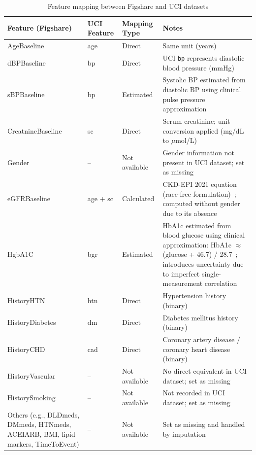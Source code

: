 \begin{table}[ht]
\centering
\caption{Feature mapping between Figshare and UCI datasets}
\label{tab:feature_mapping}
\begin{tabular}{|p{3.8cm}|p{3.2cm}|p{2.4cm}|p{5.8cm}|}
\hline
\textbf{Feature (Figshare)} & \textbf{UCI Feature} & \textbf{Mapping Type} & \textbf{Notes} \\ \hline
AgeBaseline & age & Direct & Same unit (years) \\ \hline
dBPBaseline & bp & Direct & UCI \texttt{bp} represents diastolic blood pressure (mmHg) \\ \hline
sBPBaseline & bp & Estimated & Systolic BP estimated from diastolic BP using clinical pulse pressure approximation \\ \hline
CreatnineBaseline & sc & Direct & Serum creatinine; unit conversion applied (mg/dL to $\mu$mol/L) \\ \hline
Gender & -- & Not available & Gender information not present in UCI dataset; set as missing \\ \hline
eGFRBaseline & age + sc & Calculated & CKD-EPI 2021 equation (race-free formulation)~\cite{inker2021ckdepi}; computed without gender due to its absence \\ \hline
HgbA1C & bgr & Estimated & HbA1c estimated from blood glucose using clinical approximation: HbA1c $\approx$ (glucose + 46.7) / 28.7~\cite{nathan2008a1c}; introduces uncertainty due to imperfect single-measurement correlation \\ \hline
HistoryHTN & htn & Direct & Hypertension history (binary) \\ \hline
HistoryDiabetes & dm & Direct & Diabetes mellitus history (binary) \\ \hline
HistoryCHD & cad & Direct & Coronary artery disease / coronary heart disease (binary) \\ \hline
HistoryVascular & -- & Not available & No direct equivalent in UCI dataset; set as missing \\ \hline
HistorySmoking & -- & Not available & Not recorded in UCI dataset; set as missing \\ \hline
Others (e.g., DLDmeds, DMmeds, HTNmeds, ACEIARB, BMI, lipid markers, TimeToEvent) & -- & Not available & Set as missing and handled by imputation \\ \hline
\end{tabular}
\end{table}

